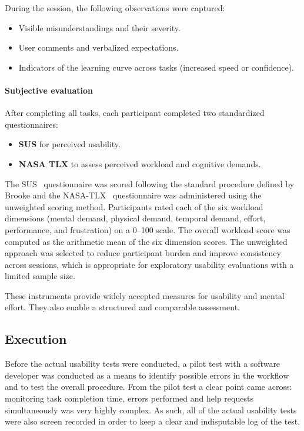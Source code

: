 During the session, the following observations were captured:

\begin{itemize}
	\item Visible misunderstandings and their severity.
	\item User comments and verbalized expectations.
	\item Indicators of the learning curve across tasks (increased speed or confidence).
\end{itemize}


\paragraph{Subjective evaluation}
\label{sec:test_usabl_subj}

After completing all tasks, each participant completed two standardized questionnaires:

\begin{itemize}
	\item \textbf{\gls{SUS}} for perceived usability.
	\item \textbf{NASA \gls{TLX}} to assess perceived workload and cognitive demands.
\end{itemize}

The \gls{SUS}~\cite{Brookesus} questionnaire was scored following the standard procedure defined by Brooke and the NASA-\gls{TLX}~\cite{HART1988139} questionnaire was administered using the unweighted scoring method. Participants rated each of the six workload dimensions (mental demand, physical demand, temporal demand, effort, performance, and frustration) on a 0–100 scale. The overall workload score was computed as the arithmetic mean of the six dimension scores. The unweighted approach was selected to reduce participant burden and improve consistency across sessions, which is appropriate for exploratory usability evaluations with a limited sample size.

These instruments provide widely accepted measures for usability and mental effort. They also enable a structured and comparable assessment.


\subsection{Execution}
\label{sec:test_usabl_proc}

Before the actual usability tests were conducted, a pilot test with a software developer was conducted as a means to identify possible errors in the workflow and to test the overall procedure. From the pilot test a clear point came across: monitoring task completion time, errors performed and help requests simultaneously was very highly complex. As such, all of the actual usability tests were also screen recorded in order to keep a clear and indisputable log of the test.

